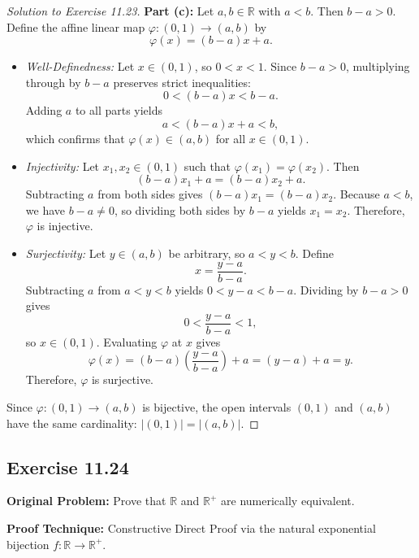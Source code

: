 \documentclass[11pt, letterpaper]{article}
\theoremstyle{definition}
\theoremstyle{remark}
\begin{document}
\begin{proof}[Solution to Exercise 11.23]
\medskip
\textbf{Part (c):} Let $a, b \in \mathbb{R}$ with $a < b$. Then $b - a > 0$. Define the affine linear map $\varphi : (0, 1) \to (a, b)$ by
\[
\varphi(x) = (b - a)x + a.
\]
\begin{itemize}
    \item \emph{Well-Definedness:} Let $x \in (0, 1)$, so $0 < x < 1$. Since $b - a > 0$, multiplying through by $b - a$ preserves strict inequalities:
    \[
    0 < (b - a)x < b - a.
    \]
    Adding $a$ to all parts yields
    \[
    a < (b - a)x + a < b,
    \]
    which confirms that $\varphi(x) \in (a, b)$ for all $x \in (0, 1)$.
    \item \emph{Injectivity:} Let $x_1, x_2 \in (0, 1)$ such that $\varphi(x_1) = \varphi(x_2)$. Then
    \[
    (b - a)x_1 + a = (b - a)x_2 + a.
    \]
    Subtracting $a$ from both sides gives $(b - a)x_1 = (b - a)x_2$. Because $a < b$, we have $b - a \neq 0$, so dividing both sides by $b - a$ yields $x_1 = x_2$. Therefore, $\varphi$ is injective.
    \item \emph{Surjectivity:} Let $y \in (a, b)$ be arbitrary, so $a < y < b$. Define
    \[
    x = \frac{y - a}{b - a}.
    \]
    Subtracting $a$ from $a < y < b$ yields $0 < y - a < b - a$. Dividing by $b - a > 0$ gives
    \[
    0 < \frac{y - a}{b - a} < 1,
    \]
    so $x \in (0, 1)$. Evaluating $\varphi$ at $x$ gives
    \[
    \varphi(x) = (b - a)\left(\frac{y - a}{b - a}\right) + a = (y - a) + a = y.
    \]
    Therefore, $\varphi$ is surjective.
\end{itemize}
Since $\varphi : (0, 1) \to (a, b)$ is bijective, the open intervals $(0, 1)$ and $(a, b)$ have the same cardinality: $|(0, 1)| = |(a, b)|$.
\end{proof}

\subsection{Exercise 11.24}

\textbf{Original Problem:} Prove that $\mathbb{R}$ and $\mathbb{R}^+$ are numerically equivalent.

\medskip
\textbf{Proof Technique:} Constructive Direct Proof via the natural exponential bijection $f : \mathbb{R} \to \mathbb{R}^+$.
\end{document}
